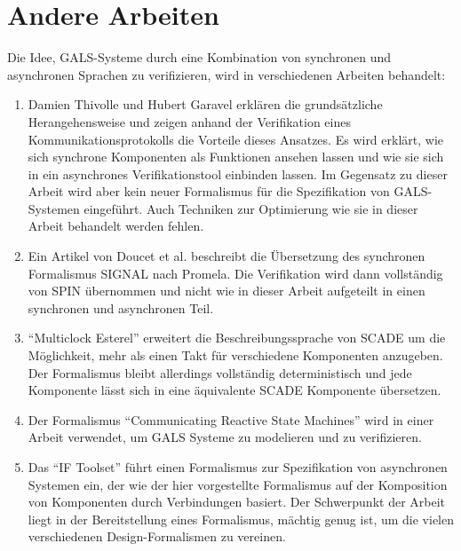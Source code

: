 \section{Andere Arbeiten}
Die Idee, GALS-Systeme durch eine Kombination von synchronen und asynchronen Sprachen zu verifizieren, wird in verschiedenen Arbeiten behandelt:
\begin{enumerate}
\item Damien Thivolle und Hubert Garavel erklären die grundsätzliche Herangehensweise und zeigen anhand der Verifikation eines Kommunikationsprotokolls die Vorteile dieses Ansatzes\cite{gals_sam}.
Es wird erklärt, wie sich synchrone Komponenten als Funktionen ansehen lassen und wie sie sich in ein asynchrones Verifikationstool einbinden lassen.
Im Gegensatz zu dieser Arbeit wird aber kein neuer Formalismus für die Spezifikation von GALS-Systemen eingeführt.
Auch Techniken zur Optimierung wie sie in dieser Arbeit behandelt werden fehlen.
\item Ein Artikel von Doucet et al. beschreibt die Übersetzung des synchronen Formalismus SIGNAL nach Promela\cite{gals_signal}.
  Die Verifikation wird dann vollständig von SPIN übernommen und nicht wie in dieser Arbeit aufgeteilt in einen synchronen und asynchronen Teil.
\item "`Multiclock Esterel"' erweitert die Beschreibungssprache von SCADE um die Möglichkeit, mehr als einen Takt für verschiedene Komponenten anzugeben\cite{multiclock_esterel}.
  Der Formalismus bleibt allerdings vollständig deterministisch und jede Komponente lässt sich in eine äquivalente SCADE Komponente übersetzen.
\item Der Formalismus "`Communicating Reactive State Machines"' wird in einer Arbeit verwendet, um GALS Systeme zu modelieren und zu verifizieren\cite{gals_crsm}.
\item Das "`IF Toolset"' führt einen Formalismus zur Spezifikation von asynchronen Systemen ein, der wie der hier vorgestellte Formalismus auf der Komposition von Komponenten durch Verbindungen basiert\cite{if_toolset}.
  Der Schwerpunkt der Arbeit liegt in der Bereitstellung eines Formalismus, mächtig genug ist, um die vielen verschiedenen Design-Formalismen zu vereinen.
\end{enumerate}